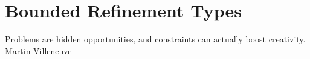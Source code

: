 \chapter{Bounded Refinement Types}\label{boundedrefinements}


\makequote
{Problems are hidden opportunities, and constraints can actually boost creativity.}
{Martin Villeneuve}

\begin{comment}
\makequote
{The more constraints one imposes, the more one frees one's self. \\
And the arbitrariness of the constraint serves only to obtain precision of execution.}
{Igor Stravinsky}
\end{comment}







